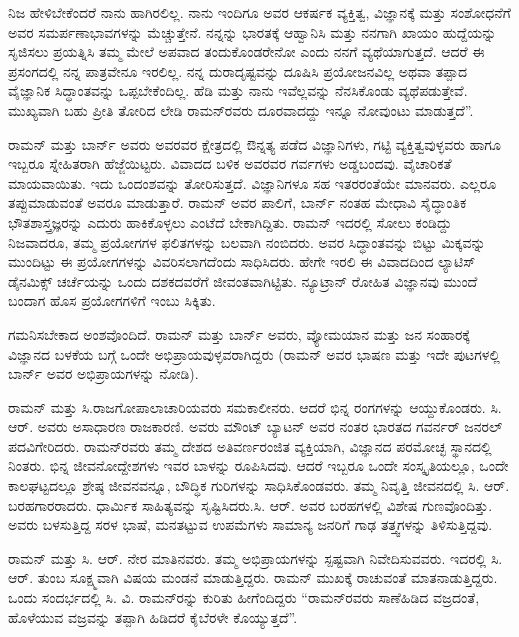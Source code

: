 ನಿಜ ಹೇಳಿಬೇಕೆಂದರೆ ನಾನು ಹಾಗಿರಲಿಲ್ಲ. ನಾನು ಇಂದಿಗೂ ಅವರ ಆಕರ್ಷಕ ವ್ಯಕ್ತಿತ್ವ, ವಿಜ್ಞಾನಕ್ಕೆ ಮತ್ತು ಸಂಶೋಧನೆಗೆ ಅವರ ಸಮರ್ಪಣಾಭಾವಗಳನ್ನು ಮೆಚ್ಚುತ್ತೇನೆ. ನನ್ನನ್ನು ಭಾರತಕ್ಕೆ ಆಹ್ವಾನಿಸಿ ಮತ್ತು ನನಗಾಗಿ ಖಾಯಂ ಹುದ್ದೆಯನ್ನು ಸೃಜಿಸಲು ಪ್ರಯತ್ನಿಸಿ ತಮ್ಮ ಮೇಲೆ ಅಪವಾದ ತಂದುಕೊಂಡರೇನೋ ಎಂದು ನನಗೆ ವ್ಯಥೆಯಾಗುತ್ತದೆ. ಆದರೆ ಈ ಪ್ರಸಂಗದಲ್ಲಿ ನನ್ನ ಪಾತ್ರವೇನೂ ಇರಲಿಲ್ಲ. ನನ್ನ ದುರಾದೃಷ್ಟವನ್ನು ದೂಷಿಸಿ ಪ್ರಯೋಜನವಿಲ್ಲ ಅಥವಾ ತಪ್ಪಾದ ವೈಜ್ಞಾನಿಕ ಸಿದ್ಧಾಂತವನ್ನು ಒಪ್ಪಬೇಕೆಂದಿಲ್ಲ. ಹೆಡಿ ಮತ್ತು ನಾನು ಇವೆಲ್ಲವನ್ನು ನೆನಸಿಕೊಂಡು ವ್ಯಥೆಪಡುತ್ತೇವೆ. ಮುಖ್ಯವಾಗಿ ಬಹು ಪ್ರೀತಿ ತೋರಿದ ಲೇಡಿ ರಾಮನ್‍ರವರು ದೂರವಾದದ್ದು ಇನ್ನೂ ನೋವುಂಟು ಮಾಡುತ್ತದೆ”.

ರಾಮನ್ ಮತ್ತು ಬಾರ್ನ್ ಅವರು ಅವರವರ ಕ್ಷೇತ್ರದಲ್ಲಿ ಔನ್ನತ್ಯ ಪಡೆದ ವಿಜ್ಞಾನಿಗಳು, ಗಟ್ಟಿ ವ್ಯಕ್ತಿತ್ವವುಳ್ಳವರು ಹಾಗೂ ಇಬ್ಬರೂ ಸ್ನೇಹಿತರಾಗಿ ಹೆಜ್ಜೆಯಿಟ್ಟರು. ವಿವಾದದ ಬಳಿಕ ಅವರವರ ಗರ್ವಗಳು ಅಡ್ಡಬಂದವು. ವೈಚಾರಿಕತೆ ಮಾಯವಾಯಿತು. ಇದು ಒಂದಂಶವನ್ನು ತೋರಿಸುತ್ತದೆ. ವಿಜ್ಞಾನಿಗಳೂ ಸಹ ಇತರರಂತೆಯೇ ಮಾನವರು. ಎಲ್ಲರೂ ತಪ್ಪುಮಾಡುವಂತೆ ಅವರೂ ಮಾಡುತ್ತಾರೆ. ರಾಮನ್ ಅವರ ಪಾಲಿಗೆ, ಬಾರ್ನ್ ನಂತಹ ಮೇಧಾವಿ ಸೈದ್ಧಾಂತಿಕ ಭೌತಶಾಸ್ತ್ರಜ್ಞರನ್ನು ಎದುರು ಹಾಕಿಕೊಳ್ಳಲು ಎಂಟೆದೆ ಬೇಕಾಗಿದ್ದಿತು. ರಾಮನ್ ಇದರಲ್ಲಿ ಸೋಲು ಕಂಡಿದ್ದು ನಿಜವಾದರೂ, ತಮ್ಮ ಪ್ರಯೋಗಗಳ ಫಲಿತಗಳನ್ನು ಬಲವಾಗಿ ನಂಬಿದರು. ಅವರ ಸಿದ್ಧಾಂತವನ್ನು ಬಿಟ್ಟು ಮಿಕ್ಕವನ್ನು ಮುಂದಿಟ್ಟು ಈ ಪ್ರಯೋಗಗಳನ್ನು ವಿವರಿಸಲಾಗದೆಂದು ಸಾಧಿಸಿದರು. ಹೇಗೇ ಇರಲಿ ಈ ವಿವಾದದಿಂದ ಲ್ಯಾಟಿಸ್ ಡೈನಮಿಕ್ಸ್ ಚರ್ಚೆಯನ್ನು ಒಂದು ದಶಕದವರೆಗೆ ಜೀವಂತವಾಗಿಟ್ಟಿತು. ನ್ಯೂಟ್ರಾನ್ ರೋಹಿತ ವಿಜ್ಞಾನವು ಮುಂದೆ ಬಂದಾಗ ಹೊಸ ಪ್ರಯೋಗಗಳಿಗೆ ಇಂಬು ಸಿಕ್ಕಿತು.

\newpage

ಗಮನಿಸಬೇಕಾದ ಅಂಶವೊಂದಿದೆ. ರಾಮನ್ ಮತ್ತು ಬಾರ್ನ್ ಅವರು, ವ್ಯೋಮಯಾನ ಮತ್ತು ಜನ ಸಂಹಾರಕ್ಕೆ ವಿಜ್ಞಾನದ ಬಳಕೆಯ ಬಗ್ಗೆ ಒಂದೇ ಅಭಿಪ್ರಾಯವುಳ್ಳವರಾಗಿದ್ದರು (ರಾಮನ್ ಅವರ ಭಾಷಣ ಮತ್ತು ಇದೇ ಪುಟಗಳಲ್ಲಿ ಬಾರ್ನ್ ಅವರ ಅಭಿಪ್ರಾಯಗಳನ್ನು ನೋಡಿ).



ರಾಮನ್ ಮತ್ತು ಸಿ.ರಾಜಗೋಪಾಲಾಚಾರಿಯವರು ಸಮಕಾಲೀನರು. ಆದರೆ ಭಿನ್ನ ರಂಗಗಳನ್ನು ಆಯ್ದುಕೊಂಡರು. ಸಿ. ಆರ್. ಅವರು ಅಸಾಧಾರಣ ರಾಜಕಾರಣಿ. ಅವರು ಮೌಂಟ್ ಬ್ಯಾಟನ್ ಅವರ ನಂತರ ಭಾರತದ ಗವರ್ನರ್ ಜನರಲ್ ಪದವಿಗೇರಿದರು. ರಾಮನ್‍ರವರು ತಮ್ಮ ದೇಶದ ಅತಿವರ್ಣರಂಜಿತ ವ್ಯಕ್ತಿಯಾಗಿ, ವಿಜ್ಞಾನದ ಪರಮೋಚ್ಛ ಸ್ಥಾನದಲ್ಲಿ ನಿಂತರು. ಭಿನ್ನ ಜೀವನೋದ್ದೇಶಗಳು ಇವರ ಬಾಳನ್ನು ರೂಪಿಸಿದವು. ಆದರೆ ಇಬ್ಬರೂ ಒಂದೇ ಸಂಸ್ಕೃತಿಯಲ್ಲೂ, ಒಂದೇ ಕಾಲಘಟ್ಟದಲ್ಲೂ ಶ್ರೇಷ್ಠ ಜೀವನವನ್ನೂ, ಬೌದ್ಧಿಕ ಗುರಿಗಳನ್ನು ಸಾಧಿಸಿಕೊಂಡವರು. ತಮ್ಮ ನಿವೃತ್ತಿ ಜೀವನದಲ್ಲಿ ಸಿ. ಆರ್. ಬರಹಗಾರರಾದರು. ಧಾರ್ಮಿಕ ಸಾಹಿತ್ಯವನ್ನು ಸೃಷ್ಟಿಸಿದರು.\break ಸಿ. ಆರ್. ಅವರ ಬರಹಗಳಲ್ಲಿ ವಿಶೇಷ ಗುಣವೊಂದಿತ್ತು. ಅವರು ಬಳಸುತ್ತಿದ್ದ ಸರಳ ಭಾಷೆ, ಮನತಟ್ಟುವ ಉಪಮೆಗಳು ಸಾಮಾನ್ಯ ಜನರಿಗೆ ಗಾಢ ತತ್ತ್ವಗಳನ್ನು ತಿಳಿಸುತ್ತಿದ್ದವು.

ರಾಮನ್ ಮತ್ತು ಸಿ. ಆರ್. ನೇರ ಮಾತಿನವರು. ತಮ್ಮ ಅಭಿಪ್ರಾಯಗಳನ್ನು ಸ್ಪಷ್ಟವಾಗಿ ನಿವೇದಿಸುವವರು. ಇದರಲ್ಲಿ ಸಿ. ಆರ್. ತುಂಬ ಸೂಕ್ಷ್ಮವಾಗಿ ವಿಷಯ ಮಂಡನೆ ಮಾಡುತ್ತಿದ್ದರು. ರಾಮನ್ ಮುಖಕ್ಕೆ ರಾಚುವಂತೆ ಮಾತನಾಡುತ್ತಿದ್ದರು. ಒಂದು ಸಂದರ್ಭದಲ್ಲಿ ಸಿ. ವಿ. ರಾಮನ್‍ರನ್ನು ಕುರಿತು ಹೀಗೆಂದಿದ್ದರು \enginline{-} “ರಾಮನ್‍ರವರು ಸಾಣೆಹಿಡಿದ ವಜ್ರದಂತೆ, ಹೊಳೆಯುವ ವಜ್ರವನ್ನು ತಪ್ಪಾಗಿ ಹಿಡಿದರೆ ಕೈಬೆರಳೇ ಕೊಯ್ಯುತ್ತದೆ”.


